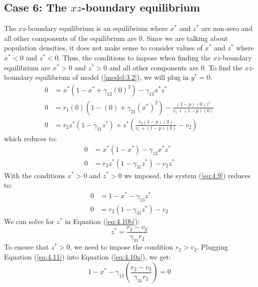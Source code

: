 \subsection{Case 6: The $xz$-boundary equilibrium}\label{subsec:xz_boundary_equilibrium}
The $xz$-boundary equilibrium is an equilibrium where $x^*$ and $z^*$ are non-zero and all other components of the equilibrium are 0. Since we are talking about population densities, it does not make sense to consider values of $x^*$ and $z^*$ where $x^*<0$ and $z^*<0$. Thus, the conditions to impose when finding the $xz$-boundary equilibrium are $x^*>0$ and $z^*>0$ and all other components are 0. To find the $xz$-boundary equilibrium of model (\ref{model:3.2}), we will plug in $y^*=0$:
\begin{align*}
    0 &= x^*\left(1-x^*+\gamma_{12}(0)^2\right)-\gamma_{13}x^*z^*\\
    0 &= r_1(0)\left(1-(0)+\gamma_{21}\left(x^*\right)^2\right)-\frac{\left(1-p\right)(0)z^*}{v_1+\left(1-p\right)(0)}\\
    0 &= r_2z^*\left(1-\gamma_{31}z^*\right)+z^*\left(\frac{v_3\left(1-p\right)(0)}{v_1+\left(1-p\right)(0)}-v_2\right)
\end{align*}
which reduces to:
\begin{subequations}
    \begin{align}
        0 &= x^*\left(1-x^*\right)-\gamma_{13}x^*z^*
        \label{eq:4.9a}\\
        0 &= r_2z^*\left(1-\gamma_{31}z^*\right)-v_2z^*
        \label{eq:4.9b}
    \end{align}
    \label{eq:4.9}
\end{subequations}
With the conditions $x^*>0$ and $z^*>0$ we imposed, the system (\ref{eq:4.9}) reduces to:
\begin{subequations}
    \begin{align}
        0 &= 1-x^*-\gamma_{13}z^*
        \label{eq:4.10a}\\
        0 &= r_2\left(1-\gamma_{31}z^*\right)-v_2
        \label{eq:4.10b}
    \end{align}
    \label{eq:4.10}
\end{subequations}
We can solve for $z^*$ in Equation (\ref{eq:4.10b}):
\begin{equation}
    z^*=\frac{r_2-v_2}{\gamma_{31}r_2}
    \label{eq:4.11}
\end{equation}
To ensure that $z^*>0$, we need to impose the condition $r_2>v_2$. Plugging Equation (\ref{eq:4.11}) into Equation (\ref{eq:4.10a}), we get:
\begin{equation}
    1-x^*-\gamma_{13}\left(\frac{r_2-v_2}{\gamma_{31}r_2}\right)=0
    \label{eq:4.12}
\end{equation}
